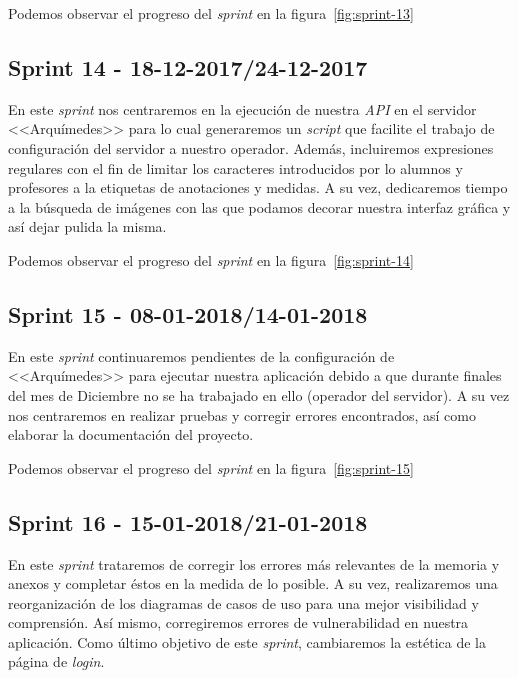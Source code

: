 Podemos observar el progreso del \textit{sprint} en la figura~\ref{fig:sprint-13}

\subsection{Sprint 14 - 18-12-2017/24-12-2017}
En este \textit{sprint} nos centraremos en la ejecución de nuestra \textit{API} en el servidor <<Arquímedes>> para lo cual generaremos un \textit{script} que facilite el trabajo de configuración del servidor a nuestro operador. Además, incluiremos expresiones regulares con el fin de limitar los caracteres introducidos por lo alumnos y profesores a la etiquetas de anotaciones y medidas. A su vez, dedicaremos tiempo a la búsqueda de imágenes con las que podamos decorar nuestra interfaz gráfica y así dejar pulida la misma.

Podemos observar el progreso del \textit{sprint} en la figura~\ref{fig:sprint-14}

\subsection{Sprint 15 - 08-01-2018/14-01-2018}
En este \textit{sprint} continuaremos pendientes de la configuración de <<Arquímedes>> para ejecutar nuestra aplicación debido a que durante finales del mes de Diciembre no se ha trabajado en ello (operador del servidor). A su vez nos centraremos en realizar pruebas y corregir errores encontrados, así como elaborar la documentación del proyecto.

Podemos observar el progreso del \textit{sprint} en la figura~\ref{fig:sprint-15}

\subsection{Sprint 16 - 15-01-2018/21-01-2018}
En este \textit{sprint} trataremos de corregir los errores más relevantes de la memoria y anexos y completar éstos en la medida de lo posible. A su vez, realizaremos una reorganización de los diagramas de casos de uso para una mejor visibilidad y comprensión. Así mismo, corregiremos errores de vulnerabilidad en nuestra aplicación. Como último objetivo de este \textit{sprint}, cambiaremos la estética de la página de \textit{login}.

